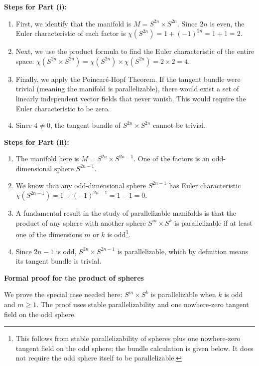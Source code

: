 \begin{solution}
\textbf{Steps for Part (i):}
\begin{enumerate}
    \item First, we identify that the manifold is $M = S^{2n} \times S^{2n}$. Since $2n$ is even, the Euler characteristic of each factor is $\chi(S^{2n}) = 1 + (-1)^{2n} = 1 + 1 = 2$.
    \item Next, we use the product formula to find the Euler characteristic of the entire space: $\chi(S^{2n} \times S^{2n}) = \chi(S^{2n}) \times \chi(S^{2n}) = 2 \times 2 = 4$.
    \item Finally, we apply the Poincaré-Hopf Theorem. If the tangent bundle were trivial (meaning the manifold is parallelizable), there would exist a set of linearly independent vector fields that never vanish. This would require the Euler characteristic to be zero.
    \item Since $4 \neq 0$, the tangent bundle of $S^{2n} \times S^{2n}$ cannot be trivial.
    \end{enumerate}

    \textbf{Steps for Part (ii):}
    \begin{enumerate}
    \item The manifold here is $M = S^{2n} \times S^{2n-1}$. One of the factors is an odd-dimensional sphere $S^{2n-1}$.
    \item We know that any odd-dimensional sphere $S^{2n-1}$ has Euler characteristic $\chi(S^{2n-1}) = 1 + (-1)^{2n-1} = 1 - 1 = 0$.
    \item A fundamental result in the study of parallelizable manifolds is that the product of any sphere with another sphere $S^m \times S^k$ is parallelizable if at least one of the dimensions $m$ or $k$ is odd\footnote{This follows from stable parallelizability of spheres plus one nowhere-zero tangent field on the odd sphere; the bundle calculation is given below. It does not require the odd sphere itself to be parallelizable.}.
    \item Since $2n-1$ is odd, $S^{2n} \times S^{2n-1}$ is parallelizable, which by definition means its tangent bundle is trivial.
    \end{enumerate}
\textbf{Formal proof for the product of spheres}

We prove the special case needed here: $S^m \times S^k$ is parallelizable when
$k$ is odd and $m\geq 1$. The proof uses stable parallelizability and one
nowhere-zero tangent field on the odd sphere.


\end{solution}
